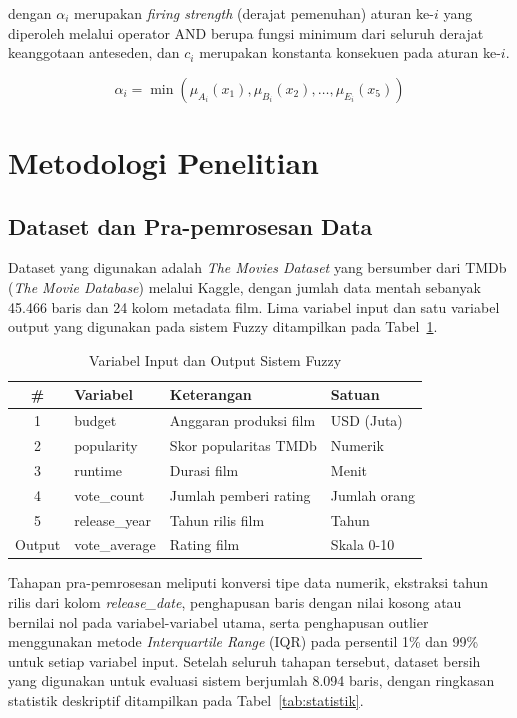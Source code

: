 \documentclass[11pt,a4paper]{article}
\begin{document}
\noindent dengan $\alpha_i$ merupakan \textit{firing strength} (derajat pemenuhan) aturan ke-$i$ yang diperoleh melalui operator AND berupa fungsi minimum dari seluruh derajat keanggotaan anteseden, dan $c_i$ merupakan konstanta konsekuen pada aturan ke-$i$.

\begin{equation}
\alpha_i = \min\left(\mu_{A_i}(x_1), \mu_{B_i}(x_2), \dots, \mu_{E_i}(x_5)\right)
\end{equation}

\section{Metodologi Penelitian}
\subsection{Dataset dan Pra-pemrosesan Data}
Dataset yang digunakan adalah \textit{The Movies Dataset} yang bersumber dari TMDb (\textit{The Movie Database}) melalui Kaggle, dengan jumlah data mentah sebanyak 45.466 baris dan 24 kolom metadata film. Lima variabel input dan satu variabel output yang digunakan pada sistem Fuzzy ditampilkan pada Tabel~\ref{tab:variabel}.

\begin{table}[H]
\centering
\caption{Variabel Input dan Output Sistem Fuzzy}
\label{tab:variabel}
\begin{tabular}{clll}
\toprule
\textbf{\#} & \textbf{Variabel} & \textbf{Keterangan} & \textbf{Satuan} \\
\midrule
1 & budget & Anggaran produksi film & USD (Juta) \\
2 & popularity & Skor popularitas TMDb & Numerik \\
3 & runtime & Durasi film & Menit \\
4 & vote\_count & Jumlah pemberi rating & Jumlah orang \\
5 & release\_year & Tahun rilis film & Tahun \\
Output & vote\_average & Rating film & Skala 0-10 \\
\bottomrule
\end{tabular}
\end{table}

Tahapan pra-pemrosesan meliputi konversi tipe data numerik, ekstraksi tahun rilis dari kolom \textit{release\_date}, penghapusan baris dengan nilai kosong atau bernilai nol pada variabel-variabel utama, serta penghapusan outlier menggunakan metode \textit{Interquartile Range} (IQR) pada persentil 1\% dan 99\% untuk setiap variabel input. Setelah seluruh tahapan tersebut, dataset bersih yang digunakan untuk evaluasi sistem berjumlah 8.094 baris, dengan ringkasan statistik deskriptif ditampilkan pada Tabel~\ref{tab:statistik}.
\end{document}
